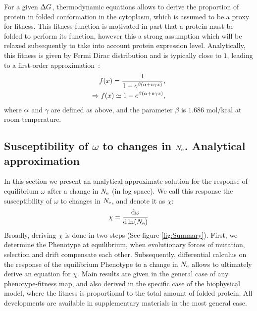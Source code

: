For a given $\Delta G$, thermodynamic equations allows to derive the proportion of protein in folded conformation in the cytoplasm, which is assumed to be a proxy for fitness.
This fitness function is motivated in part that a protein must be folded to perform its function, however this a strong assumption which will be relaxed subsequently to take into account protein expression level.
Analytically, this fitness is given by Fermi Dirac distribution and is typically close to $1$, leading to a first-order approximation~\citep{Goldstein2011}:
\begin{align}
 f(x) = \dfrac{1}{1 + e^{\beta (\alpha + \text{n} \gamma x)}},\\
 \Rightarrow f(x) \simeq 1 - e^{\beta (\alpha + \text{n} \gamma x)}, 
\end{align}
where $\alpha$ and $\gamma$ are defined as above, and the parameter $\beta$ is $1.686$ mol/kcal at room temperature.

\subsection{Susceptibility of \texorpdfstring{$\omega$}{ω} to changes in \texorpdfstring{$N_{\mathrm{e}}$}{Nₑ}. Analytical approximation}

In this section we present an analytical approximate solution for the response of equilibrium $\omega$ after a change in $N_{\mathrm{e}}$ (in log space). We call this response the susceptibility of $\omega$ to changes in $N_{\mathrm{e}}$, and denote it as $\chi$:
\begin{align}
 \chi = \frac{ \der \omega}{\der \ln (\Ne)} \label{eq:chi}
\end{align}
Broadly, deriving $\chi$ is done in two steps (See figure \ref{fig:Summary}).
First, we determine the \gls{Phenotype} at equilibrium, when evolutionary forces of mutation, selection and \gls{drift} compensate each other.
Subsequently, differential calculus on the response of the equilibrium \gls{Phenotype} to a change in $N_{\mathrm{e}}$ allows to ultimately derive an equation for $\chi$.
Main results are given in the general case of any phenotype-fitness map, and also derived in the specific case of the biophysical model, where the fitness is proportional to the total amount of folded protein.
All developments are available in supplementary materials in the most general case.

